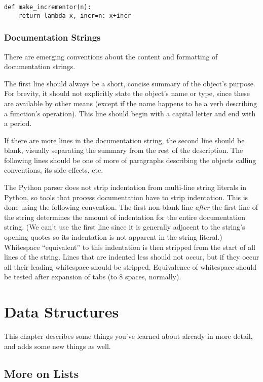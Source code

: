 \documentclass{manual}
\begin{document}
\begin{verbatim}
def make_incrementor(n):
    return lambda x, incr=n: x+incr
\end{verbatim}

\subsection{Documentation Strings \label{docstrings}}

There are emerging conventions about the content and formatting of
documentation strings.

The first line should always be a short, concise summary of the
object's purpose.  For brevity, it should not explicitly state the
object's name or type, since these are available by other means
(except if the name happens to be a verb describing a function's
operation).  This line should begin with a capital letter and end with
a period.

If there are more lines in the documentation string, the second line
should be blank, visually separating the summary from the rest of the
description.  The following lines should be one of more of paragraphs
describing the objects calling conventions, its side effects, etc.

The Python parser does not strip indentation from multi-line string
literals in Python, so tools that process documentation have to strip
indentation.  This is done using the following convention.  The first
non-blank line \emph{after} the first line of the string determines the
amount of indentation for the entire documentation string.  (We can't
use the first line since it is generally adjacent to the string's
opening quotes so its indentation is not apparent in the string
literal.)  Whitespace ``equivalent'' to this indentation is then
stripped from the start of all lines of the string.  Lines that are
indented less should not occur, but if they occur all their leading
whitespace should be stripped.  Equivalence of whitespace should be
tested after expansion of tabs (to 8 spaces, normally).



\chapter{Data Structures \label{structures}}

This chapter describes some things you've learned about already in
more detail, and adds some new things as well.

\section{More on Lists \label{moreLists}}
\end{document}
